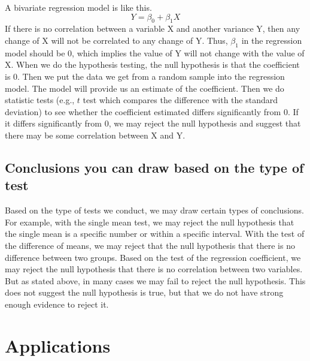 \documentclass{book}
\begin{document}
A bivariate regression model is like this. \[Y=\beta_{0} + \beta_{1} X\] If
there is no correlation between a variable X and another variance Y, then any
change of X will not be correlated to any change of Y. Thus, \(\beta_{1}\) in
the regression model should be 0, which implies the value of Y will not change
with the value of X. When we do the hypothesis testing, the null hypothesis is
that the coefficient is 0. Then we put the data we get from a random sample
into the regression model. The model will provide us an estimate of the
coefficient. Then we do statistic tests (e.g., \(t\) test which compares the
difference with the standard deviation) to see whether the coefficient
estimated differs significantly from 0. If it differs significantly from 0, we
may reject the null hypothesis and suggest that there may be some correlation
between X and Y.

\hypertarget{conclusions-you-can-draw-based-on-the-type-of-test}{%
\subsection{Conclusions you can draw based on the type of
test}\label{conclusions-you-can-draw-based-on-the-type-of-test}}

Based on the type of tests we conduct, we may draw certain types of
conclusions. For example, with the single mean test, we may reject the null
hypothesis that the single mean is a specific number or within a specific
interval. With the test of the difference of means, we may reject that the
null hypothesis that there is no difference between two groups. Based on the
test of the regression coefficient, we may reject the null hypothesis that
there is no correlation between two variables. But as stated above, in many
cases we may fail to reject the null hypothesis. This does not suggest the
null hypothesis is true, but that we do not have strong enough evidence to
reject it.

\hypertarget{applications}{%
\section{Applications}\label{applications}}
\end{document}
